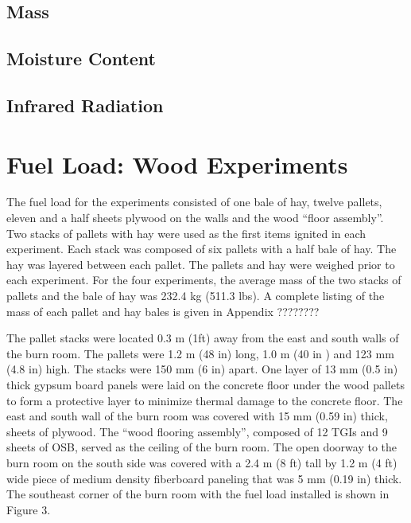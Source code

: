 \documentclass[12pt,oneside]{book}
\begin{document}
	\subsection{Mass}
	\label{subsec:Mass}
	
	\subsection{Moisture Content}
	\label{subsec:Moisture_Content}
	
	\subsection{Infrared Radiation}
	\label{subsec:Infrared_Radiation}
	
	\section{Fuel Load: Wood Experiments}
	\label{sec:Fuel_Load:_Wood_Experiments} 
	
	The fuel load for the experiments consisted of one bale of hay, twelve pallets, eleven and a half sheets plywood on the walls and the wood “floor assembly”.
	Two stacks of pallets with hay were used as the first items ignited in each experiment.  Each stack was composed of six pallets with a half bale of hay.  The hay was layered between each pallet.  The pallets and hay were weighed prior to each experiment.  For the four experiments, the average mass of the two stacks of pallets and the bale of hay was 232.4 kg (511.3 lbs).  A complete listing of the mass of each pallet and hay bales is given in Appendix ????????
	  
	The pallet stacks were located 0.3 m (1ft) away from the east and south walls of the burn room.  The pallets were 1.2 m (48 in) long, 1.0 m (40 in ) and 123 mm (4.8 in) high.  The stacks were 150 mm (6 in) apart.  One layer of 13 mm (0.5 in) thick gypsum board panels were laid on the concrete floor under the wood pallets to form a protective layer to minimize thermal damage to the concrete floor.
	The east and south wall of the burn room was covered with 15 mm (0.59 in) thick, sheets of plywood.  The “wood flooring assembly”, composed of 12 TGIs and 9 sheets of OSB, served as the ceiling of the burn room.  The open doorway to the burn room on the south side was covered with a 2.4 m (8 ft) tall by 1.2 m (4 ft) wide piece of medium density fiberboard paneling that was 5 mm (0.19 in) thick.  The southeast corner of the burn room with the fuel load installed is shown in Figure 3.
	
\end{document}
